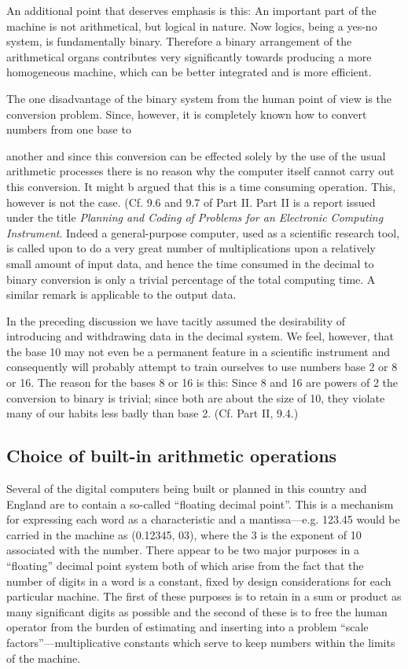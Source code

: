 \documentclass[12pt]{amsart}
\begin{document}
An additional point that deserves emphasis is this: An important part of the machine is not arithmetical, but logical in nature. Now logics, being a yes-no system, is fundamentally binary. Therefore a binary arrangement of the arithmetical organs contributes very significantly towards producing a more homogeneous machine, which can be better integrated and is more efficient.

The one disadvantage of the binary system from the human point of view is the conversion problem. Since, however, it is completely known how to convert numbers from one base to

another and since this conversion can be effected solely by the use of the usual arithmetic processes there is no reason why the computer itself cannot carry out this conversion. It might b argued that this is a time consuming operation. This, however is not the case. (Cf. 9.6 and 9.7 of Part II. Part II is a report issued under the title \emph{Planning and Coding of Problems for an Electronic Computing Instrument}. Indeed a general-purpose computer, used as a scientific research tool, is called upon to do a very great number of multiplications upon a relatively small amount of input data, and hence the time consumed in the decimal to binary conversion is only a trivial percentage of the total computing time. A similar remark is applicable to the output data.

In the preceding discussion we have tacitly assumed the desirability of introducing and withdrawing data in the decimal system. We feel, however, that the base 10 may not even be a permanent feature in a scientific instrument and consequently will probably attempt to train ourselves to use numbers base 2 or 8 or 16. The reason for the bases 8 or 16 is this: Since 8 and 16 are powers of 2 the conversion to binary is trivial; since both are about the size of 10, they violate many of our habits less badly than base 2. (Cf. Part II, 9.4.)

\subsection{Choice of built-in arithmetic operations}
Several of the digital computers being built or planned in this country and England are to contain a so-called ``floating decimal point''. This is a mechanism for expressing each word as a characteristic and a mantissa---e.g. 123.45 would be carried in the machine as (0.12345, 03), where the 3 is the exponent of 10 associated with the number. There appear to be two major purposes in a ``floating'' decimal point system both of which arise from the fact that the number of digits in a word is a constant, fixed by design considerations for each particular machine. The first of these purposes is to retain in a sum or product as many significant digits as possible and the second of these is to free the human operator from the burden of estimating and inserting into a problem ``scale factors''---multiplicative constants which serve to keep numbers within the limits of the machine.
\end{document}

